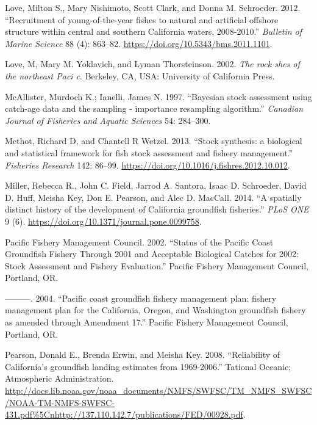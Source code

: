 \documentclass[11pt,
  english,
  a4paper,
]{article}
\newlength{\cslhangindent}
\newenvironment{CSLReferences}[2] %
 {%
  \setlength{\parindent}{0pt}
  \ifodd #1 \everypar{\setlength{\hangindent}{\cslhangindent}}\ignorespaces\fi
  \ifnum #2 > 0
  \setlength{\parskip}{#2\baselineskip}
  \fi
 }%
 {}
\begin{document}
\begin{CSLReferences}{1}{0}
\leavevmode{}%
Love, Milton S., Mary Nishimoto, Scott Clark, and Donna M. Schroeder. 2012. {``{Recruitment of young-of-the-year fishes to natural and artificial offshore structure within central and southern California waters, 2008-2010}.''} \emph{Bulletin of Marine Science} 88 (4): 863--82. \url{https://doi.org/10.5343/bms.2011.1101}.

\leavevmode{}%
Love, M, Mary M. Yoklavich, and Lyman Thorsteinson. 2002. \emph{{The rock shes of the northeast Paci c}}. Berkeley, CA, USA: University of California Press.

\leavevmode{}%
McAllister, Murdoch K.; Ianelli, James N. 1997. {``{Bayesian stock assessment using catch-age data and the sampling - importance resampling algorithm}.''} \emph{Canadian Journal of Fisheries and Aquatic Sciences} 54: 284--300.

\leavevmode{}%
Methot, Richard D, and Chantell R Wetzel. 2013. {``{Stock synthesis: a biological and statistical framework for fish stock assessment and fishery management}.''} \emph{Fisheries Research} 142: 86--99. \url{https://doi.org/10.1016/j.fishres.2012.10.012}.

\leavevmode{}%
Miller, Rebecca R., John C. Field, Jarrod A. Santora, Isaac D. Schroeder, David D. Huff, Meisha Key, Don E. Pearson, and Alec D. MacCall. 2014. {``{A spatially distinct history of the development of California groundfish fisheries}.''} \emph{PLoS ONE} 9 (6). \url{https://doi.org/10.1371/journal.pone.0099758}.

\leavevmode{}%
Pacific Fishery Management Council. 2002. {``{Status of the Pacific Coast Groundfish Fishery Through 2001 and Acceptable Biological Catches for 2002: Stock Assessment and Fishery Evaluation.}''} Pacific Fishery Management Council, Portland, OR.

\leavevmode{}%
---------. 2004. {``{Pacific coast groundfish fishery management plan: fishery management plan for the California, Oregon, and Washington groundfish fishery as amended through Amendment 17}.''} Pacific Fishery Management Council, Portland, OR.

\leavevmode{}%
Pearson, Donald E., Brenda Erwin, and Meisha Key. 2008. {``{Reliability of California's groundfish landing estimates from 1969-2006}.''} Tational Oceanic; Atmospheric Administration. \url{http://docs.lib.noaa.gov/noaa_documents/NMFS/SWFSC/TM_NMFS_SWFSC/NOAA-TM-NMFS-SWFSC-431.pdf\%5Cnhttp://137.110.142.7/publications/FED/00928.pdf}.


\end{CSLReferences}
\end{document}
